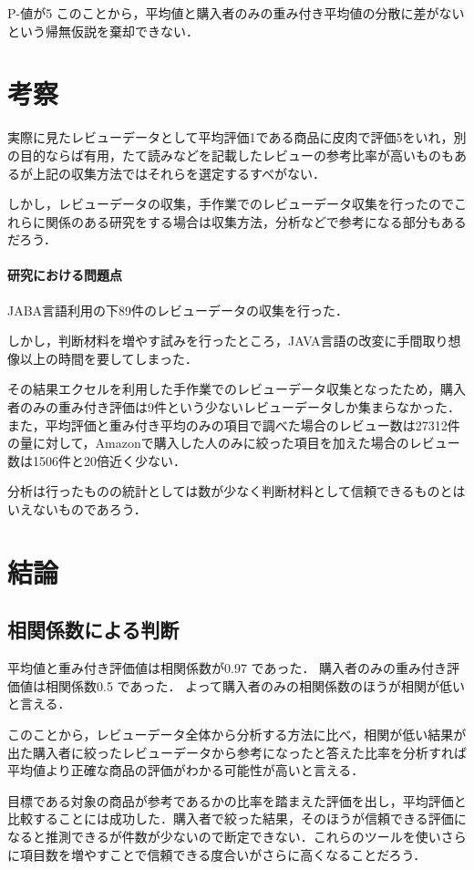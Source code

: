P-値が5%
このことから，平均値と購入者のみの重み付き平均値の分散に差がないという帰無仮説を棄却できない．




\chapter{考察}

実際に見たレビューデータとして平均評価1である商品に皮肉で評価5をいれ，別の目的ならば有用，たて読みなどを記載したレビューの参考比率が高いものもあるが上記の収集方法ではそれらを選定するすべがない．

しかし，レビューデータの収集，手作業でのレビューデータ収集を行ったのでこれらに関係のある研究をする場合は収集方法，分析などで参考になる部分もあるだろう．

\subsubsection{研究における問題点}
JABA言語利用の下89件のレビューデータの収集を行った．

しかし，判断材料を増やす試みを行ったところ，JAVA言語の改変に手間取り想像以上の時間を要してしまった．

その結果エクセルを利用した手作業でのレビューデータ収集となったため，購入者のみの重み付き評価は9件という少ないレビューデータしか集まらなかった．
また，平均評価と重み付き平均のみの項目で調べた場合のレビュー数は27312件の量に対して，Amazonで購入した人のみに絞った項目を加えた場合のレビュー数は1506件と20倍近く少ない．

分析は行ったものの統計としては数が少なく判断材料として信頼できるものとはいえないものであろう．


\chapter{結論}


\section{相関係数による判断}


平均値と重み付き評価値は相関係数が0.97 であった．
購入者のみの重み付き評価値は相関係数0.5 であった．
よって購入者のみの相関係数のほうが相関が低いと言える．

このことから，レビューデータ全体から分析する方法に比べ，相関が低い結果が出た購入者に絞ったレビューデータから参考になったと答えた比率を分析すれば平均値より正確な商品の評価がわかる可能性が高いと言える．

目標である対象の商品が参考であるかの比率を踏まえた評価を出し，平均評価と比較することには成功した．購入者で絞った結果，そのほうが信頼できる評価になると推測できるが件数が少ないので断定できない．これらのツールを使いさらに項目数を増やすことで信頼できる度合いがさらに高くなることだろう．







